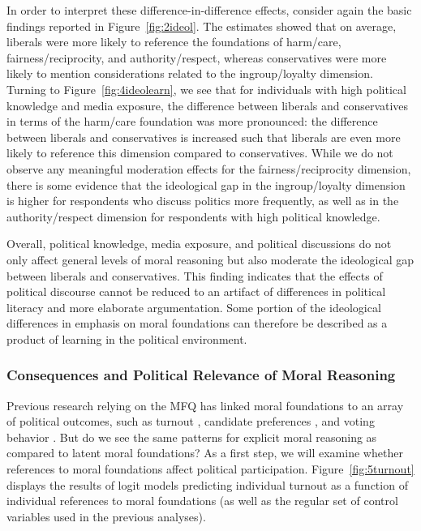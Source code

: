 \documentclass[12pt]{article}
\begin{document}
In order to interpret these difference-in-difference effects, consider again the basic findings reported in Figure~\ref{fig:2ideol}. The estimates showed that on average, liberals were more likely to reference the foundations of harm/care, fairness/reciprocity, and authority/respect, whereas conservatives were more likely to mention considerations related to the ingroup/loyalty dimension. Turning to Figure~\ref{fig:4ideolearn}, we see that for individuals with high political knowledge and media exposure, the difference between liberals and conservatives in terms of the harm/care foundation was more pronounced: the difference between liberals and conservatives is increased such that liberals are even more likely to reference this dimension compared to conservatives. While we do not observe any meaningful moderation effects for the fairness/reciprocity dimension, there is some evidence that the ideological gap in the ingroup/loyalty dimension is higher for respondents who discuss politics more frequently, as well as in the authority/respect dimension for respondents with high political knowledge.

Overall, political knowledge, media exposure, and political discussions do not only affect general levels of moral reasoning but also moderate the ideological gap between liberals and conservatives. This finding indicates that the effects of political discourse cannot be reduced to an artifact of differences in political literacy and more elaborate argumentation. Some portion of the ideological differences in emphasis on moral foundations can therefore be described as a product of learning in the political environment.
\clearpage


\subsubsection{Consequences and Political Relevance of Moral Reasoning}

Previous research relying on the MFQ has linked moral foundations to an array of political outcomes, such as turnout \citep{johnson2014ideology}, candidate preferences \citep{iyer2010beyond}, and voting behavior \citep{franks2015using}. But do we see the same patterns for explicit moral reasoning as compared to latent moral foundations? As a first step, we will examine whether references to moral foundations affect political participation. Figure~\ref{fig:5turnout} displays the results of logit models predicting individual turnout as a function of individual references to moral foundations (as well as the regular set of control variables used in the previous analyses).
\end{document}

